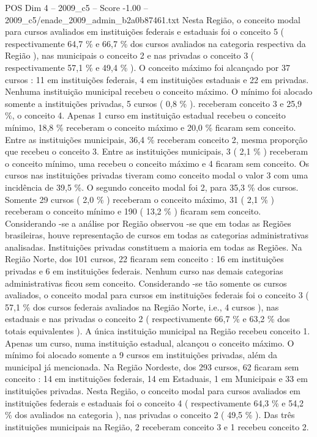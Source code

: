 \begin{textsample}{POS Dim 4 – 2009\_c5 – Score -1.00 – 2009\_c5/enade\_2009\_admin\_b2a0b87461.txt}
Nesta Região, o conceito modal para cursos avaliados em instituições federais e estaduais foi o conceito 5 ( respectivamente 64,7 \% e 66,7 \% dos cursos avaliados na categoria respectiva da Região ), nas municipais o conceito 2 e nas privadas o conceito 3 ( respectivamente 57,1 \% e 49,4 \% ).
O conceito máximo foi alcançado por 37 cursos : 11 em instituições federais, 4 em instituições estaduais e 22 em privadas.
Nenhuma instituição municipal recebeu o conceito máximo.
O mínimo foi alocado somente a instituições privadas, 5 cursos ( 0,8 \% ). receberam conceito 3 e 25,9 \%, o conceito 4.
Apenas 1 curso em instituição estadual recebeu o conceito mínimo, 18,8 \% receberam o conceito máximo e 20,0 \% ficaram sem conceito.
Entre as instituições municipais, 36,4 \% receberam conceito 2, mesma proporção que recebeu o conceito 3.
Entre as instituições municipais, 3 ( 2,1 \% ) receberam o conceito mínimo, uma recebeu o conceito máximo e 4 ficaram sem conceito.
Os cursos nas instituições privadas tiveram como conceito modal o valor 3 com uma incidência de 39,5 \%.
O segundo conceito modal foi 2, para 35,3 \% dos cursos.
Somente 29 cursos ( 2,0 \% ) receberam o conceito máximo, 31 ( 2,1 \% ) receberam o conceito mínimo e 190 ( 13,2 \% ) ficaram sem conceito.
Considerando -se a análise por Região observou -se que em todas as Regiões brasileiras, houve representação de cursos em todas as categorias administrativas analisadas.
Instituições privadas constituem a maioria em todas as Regiões.
Na Região Norte, dos 101 cursos, 22 ficaram sem conceito : 16 em instituições privadas e 6 em instituições federais.
Nenhum curso nas demais categorias administrativas ficou sem conceito.
Considerando -se tão somente os cursos avaliados, o conceito modal para cursos em instituições federais foi o conceito 3 ( 57,1 \% dos cursos federais avaliados na Região Norte, i.e., 4 cursos ), nas estaduais e nas privadas o conceito 2 ( respectivamente 66,7 \% e 63,2 \% dos totais equivalentes ).
A única instituição municipal na Região recebeu conceito 1.
Apenas um curso, numa instituição estadual, alcançou o conceito máximo.
O mínimo foi alocado somente a 9 cursos em instituições privadas, além da municipal já mencionada.
Na Região Nordeste, dos 293 cursos, 62 ficaram sem conceito : 14 em instituições federais, 14 em Estaduais, 1 em Municipais e 33 em instituições privadas.
Nesta Região, o conceito modal para cursos avaliados em instituições federais e estaduais foi o conceito 4 ( respectivamente 64,3 \% e 54,2 \% dos avaliados na categoria ), nas privadas o conceito 2 ( 49,5 \% ).
Das três instituições municipais na Região, 2 receberam conceito 3 e 1 recebeu conceito 2.

\end{textsample}
